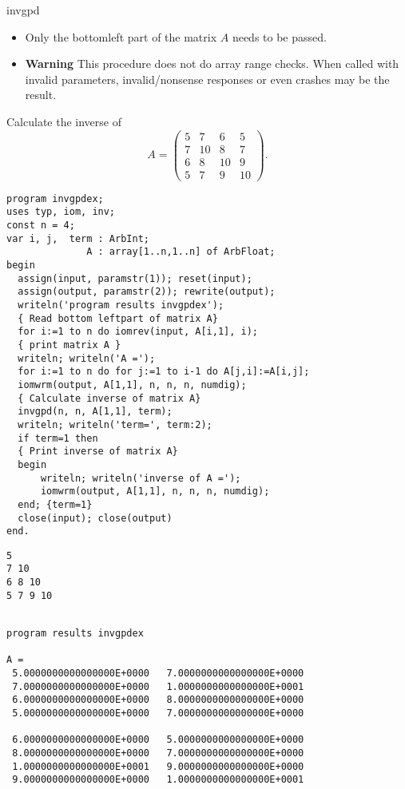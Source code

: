 \documentclass{report}
\newcommand{\Example}{\item[Example]\rmfamily}
\newcommand{\ProgramData}{\item[Example Data]\rmfamily}
\newcommand{\ProgramResults}{\item[Example Result]\rmfamily}
\begin{document}
\begin{procedure}{invgpd}
\begin{itemize}
\item Only the bottomleft part of the matrix $A$ needs to be passed.
\item \textbf{Warning} This procedure does not do array range checks. When called with invalid
parameters, invalid/nonsense responses or even crashes may be the result.
\end{itemize}

\Example

Calculate the inverse of 
\[
 A=
 \left(
 \begin{array}{rrrr}
   5 & 7 & 6 & 5  \\
   7 & 10 & 8 & 7 \\
   6 & 8 & 10 & 9 \\
   5 & 7 & 9 & 10
 \end{array}
 \right)
 .
\]

\begin{lstlisting}
program invgpdex;
uses typ, iom, inv;
const n = 4;
var i, j,  term : ArbInt;
              A : array[1..n,1..n] of ArbFloat;
begin
  assign(input, paramstr(1)); reset(input);
  assign(output, paramstr(2)); rewrite(output);
  writeln('program results invgpdex');
  { Read bottom leftpart of matrix A}
  for i:=1 to n do iomrev(input, A[i,1], i);
  { print matrix A }
  writeln; writeln('A =');
  for i:=1 to n do for j:=1 to i-1 do A[j,i]:=A[i,j];
  iomwrm(output, A[1,1], n, n, n, numdig);
  { Calculate inverse of matrix A}
  invgpd(n, n, A[1,1], term);
  writeln; writeln('term=', term:2);
  if term=1 then
  { Print inverse of matrix A}
  begin
      writeln; writeln('inverse of A =');
      iomwrm(output, A[1,1], n, n, n, numdig);
  end; {term=1}
  close(input); close(output)
end.
\end{lstlisting}

\ProgramData

\begin{verbatim}
5
7 10
6 8 10
5 7 9 10
\end{verbatim}

\ProgramResults
\begin{verbatim}

program results invgpdex

A =
 5.0000000000000000E+0000   7.0000000000000000E+0000
 7.0000000000000000E+0000   1.0000000000000000E+0001
 6.0000000000000000E+0000   8.0000000000000000E+0000
 5.0000000000000000E+0000   7.0000000000000000E+0000

 6.0000000000000000E+0000   5.0000000000000000E+0000
 8.0000000000000000E+0000   7.0000000000000000E+0000
 1.0000000000000000E+0001   9.0000000000000000E+0000
 9.0000000000000000E+0000   1.0000000000000000E+0001


\end{verbatim}
\end{procedure}
\end{document}
